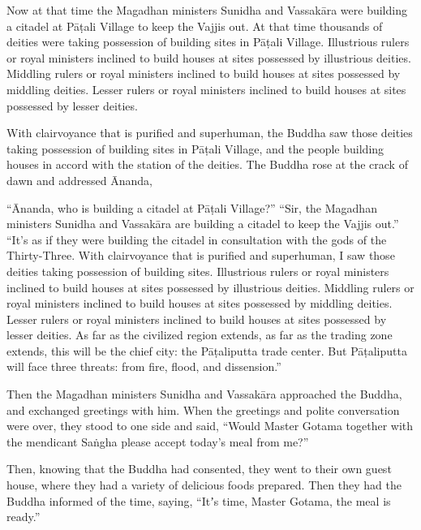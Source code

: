 \documentclass[12pt,openany]{book}%
\begin{document}
Now at that time the Magadhan ministers Sunidha and \textsanskrit{Vassakāra} were building a citadel at \textsanskrit{Pāṭali} Village to keep the Vajjis out. At that time thousands of deities were taking possession of building sites in \textsanskrit{Pāṭali} Village. Illustrious rulers or royal ministers inclined to build houses at sites possessed by illustrious deities. Middling rulers or royal ministers inclined to build houses at sites possessed by middling deities. Lesser rulers or royal ministers inclined to build houses at sites possessed by lesser deities. 

With clairvoyance that is purified and superhuman, the Buddha saw those deities taking possession of building sites in \textsanskrit{Pāṭali} Village, and the people building houses in accord with the station of the deities. The Buddha rose at the crack of dawn and addressed Ānanda, 

“Ānanda, who is building a citadel at \textsanskrit{Pāṭali} Village?” “Sir, the Magadhan ministers Sunidha and \textsanskrit{Vassakāra} are building a citadel to keep the Vajjis out.” “It’s as if they were building the citadel in consultation with the gods of the Thirty-Three. With clairvoyance that is purified and superhuman, I saw those deities taking possession of building sites. Illustrious rulers or royal ministers inclined to build houses at sites possessed by illustrious deities. Middling rulers or royal ministers inclined to build houses at sites possessed by middling deities. Lesser rulers or royal ministers inclined to build houses at sites possessed by lesser deities. As far as the civilized region extends, as far as the trading zone extends, this will be the chief city: the \textsanskrit{Pāṭaliputta} trade center. But \textsanskrit{Pāṭaliputta} will face three threats: from fire, flood, and dissension.” 

Then the Magadhan ministers Sunidha and \textsanskrit{Vassakāra} approached the Buddha, and exchanged greetings with him. When the greetings and polite conversation were over, they stood to one side and said, “Would Master Gotama together with the mendicant \textsanskrit{Saṅgha} please accept today’s meal from me?” 

Then, knowing that the Buddha had consented, they went to their own guest house, where they had a variety of delicious foods prepared. Then they had the Buddha informed of the time, saying, “Itʼs time, Master Gotama, the meal is ready.” 
\end{document}

